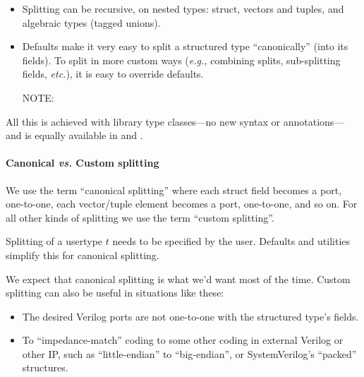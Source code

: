 \begin{itemize}

  \item Splitting can be recursive, on nested types: struct, vectors
    and tuples, and algebraic types (tagged unions).

  \item Defaults make it very easy to split a structured type
    ``canonically'' (into its fields). To split in more custom ways
    (\emph{e.g.,} combining splits, sub-splitting fields,
    \emph{etc.}), it is easy to override defaults.

    NOTE: \hfill {}

\end{itemize}

All this is achieved with library type classes---no new syntax or
annotations--- and is equally available in {\BSVb} and {\BHb}.


\paragraph{Canonical \emph{vs.} Custom splitting}

\hspace*{1em}


We use the term ``canonical splitting'' where each struct field
becomes a port, one-to-one, each vector/tuple element becomes a port,
one-to-one, and so on.  For all other kinds of splitting we use the
term ``custom splitting''.

Splitting of a usertype $t$ needs to be specified by the user.
Defaults and utilities simplify this for canonical splitting.

We expect that canonical splitting is what we'd want most of the time.
Custom splitting can also be useful in situations like these:

\begin{itemize}

  \item The desired Verilog ports are not one-to-one with the
    {\BLANGS} structured type's fields.

  \item To ``impedance-match'' {\BLANGS} coding to some other coding
    in external Verilog or other IP, such as ``little-endian'' to
    ``big-endian'', or SystemVerilog's ``packed'' structures.

\end{itemize}


